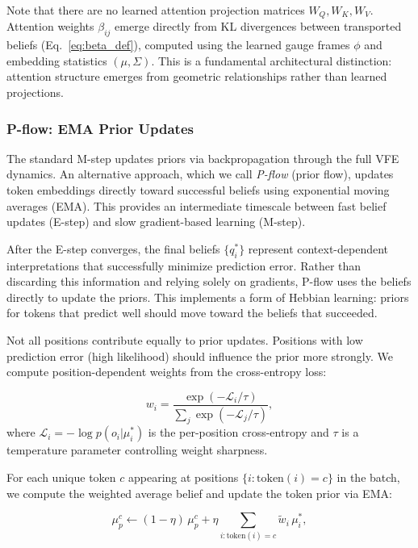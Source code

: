 \documentclass[twoside,11pt]{article}
\begin{document}
Note that there are no learned attention projection matrices $W_Q, W_K, W_V$. Attention weights $\beta_{ij}$ emerge directly from KL divergences between transported beliefs (Eq.~\ref{eq:beta_def}), computed using the learned gauge frames $\phi$ and embedding statistics $(\mu, \Sigma)$. This is a fundamental architectural distinction: attention structure emerges from geometric relationships rather than learned projections.

\subsubsection{P-flow: EMA Prior Updates}
\label{sec:p_flow}

The standard M-step updates priors via backpropagation through the full VFE dynamics. An alternative approach, which we call \emph{P-flow} (prior flow), updates token embeddings directly toward successful beliefs using exponential moving averages (EMA). This provides an intermediate timescale between fast belief updates (E-step) and slow gradient-based learning (M-step).

After the E-step converges, the final beliefs $\{q_i^*\}$ represent context-dependent interpretations that successfully minimize prediction error. Rather than discarding this information and relying solely on gradients, P-flow uses the beliefs directly to update the priors. This implements a form of Hebbian learning: priors for tokens that predict well should move toward the beliefs that succeeded.

Not all positions contribute equally to prior updates. Positions with low prediction error (high likelihood) should influence the prior more strongly. We compute position-dependent weights from the cross-entropy loss:

\begin{equation}
w_i = \frac{\exp(-\mathcal{L}_i / \tau)}{\sum_j \exp(-\mathcal{L}_j / \tau)},
\label{eq:p_flow_weights}
\end{equation}
where $\mathcal{L}_i = -\log p(o_i | \mu_i^*)$ is the per-position cross-entropy and $\tau$ is a temperature parameter controlling weight sharpness.

For each unique token $c$ appearing at positions $\{i : \text{token}(i) = c\}$ in the batch, we compute the weighted average belief and update the token prior via EMA:

\begin{equation}
\mu_p^c \leftarrow (1 - \eta) \, \mu_p^c + \eta \sum_{i : \text{token}(i) = c} \tilde{w}_i \, \mu_i^*,
\label{eq:p_flow_ema}
\end{equation}
\end{document}
